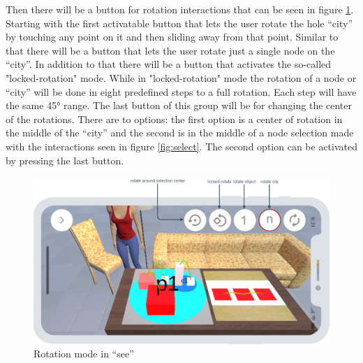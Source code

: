 Then there will be a button for rotation interactions that can be seen in figure \ref{fig:rotate}.
Starting with the first activatable button that lets the user rotate the hole \enquote{\gls{city}} by touching any point on it and then sliding away from that point.
Similar to that there will be a button that lets the user rotate just a single node on the \enquote{\gls{city}}.
In addition to that there will be a button that activates the so-called "locked-rotation" mode.
While in "locked-rotation" mode the rotation of a node or \enquote{\gls{city}} will be done in eight predefined steps to a full rotation.
Each step will have the same 45° range.
The last button of this group will be for changing the center of the rotations. 
There are to options: the first option is a center of rotation in the middle of the \enquote{\gls{city}} and the second is in the middle of a node selection made with the interactions seen in figure \ref{fig:select}.
The second option can be activated by pressing the last button.

\begin{figure}[htb]
    \centering
    \includegraphics[width=1\textwidth]{Concept/img/menu4.png}
    \caption{Rotation mode in \enquote{\gls{see}}}\label{fig:rotate}
\end{figure}

